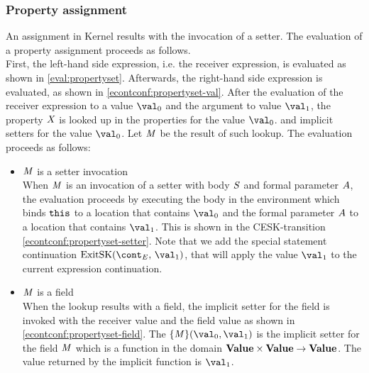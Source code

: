 \documentclass{article}
\begin{document}
\subsubsection{Property assignment}
\label{subsubsec:property-assignment}
An assignment in Kernel results with the invocation of a setter.
The evaluation of a property assignment proceeds as follows.\\
First, the left-hand side expression, i.e. the receiver expression, is evaluated as shown in \eqref{eval:propertyset}.
Afterwards, the right-hand side expression is evaluated, as shown in \eqref{econtconf:propertyset-val}.
After the evaluation of the receiver expression to a value $\val_0$ and the argument to value $\val_1$, the property $\mathit{X}$ is looked up in the properties for the value $\val_0$.
and implicit setters for the value $\val_0$.
Let $\mathit{M}$ be the result of such lookup.
The evaluation proceeds as follows:
\begin{itemize}
\item $\mathit{M}$ is a setter invocation\\
When $\mathit{M}$ is an invocation of a setter with body $\mathit{S}$ and formal parameter $A$, the evaluation proceeds by executing the body in the environment which binds $\tt{this}$ to a location that contains $\val_0$ and the formal parameter $A$ to a location that contains $\val_1$.
This is shown in the CESK-transition \eqref{econtconf:propertyset-setter}.
Note that we add the special statement continuation $\ExitSK{\val_1}$, that will apply the value $\val_1$ to the current expression continuation.
\item $\mathit{M}$ is a field\\
When the lookup results with a field, the implicit setter for the field is invoked with the receiver value and the field value as shown in \eqref{econtconf:propertyset-field}.
The $\{\membermeta\}(\val_0, \val_1)$ is the implicit setter for the field $\mathit{M}$ which is a function in the domain $\mathbf{Value} \times \mathbf{Value} \rightarrow \mathbf{Value}$.
The value returned by the implicit function is $\val_1$.
\end{itemize}
\end{document}
